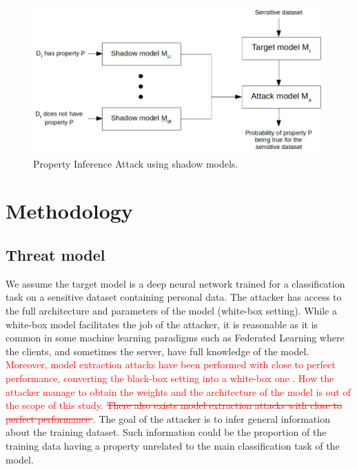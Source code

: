 \documentclass[11pt]{article}
\begin{document}
\begin{figure}[h]
    \centering
    \begin{minipage}{\textwidth}
        \centering
        \includegraphics[width=0.99\textwidth]{pia_diagram2.png} %
        \caption{Property Inference Attack using shadow models.}
        \label{pia_diagram}
    \end{minipage}\hfill
\end{figure}

\section{Methodology}

\subsection{Threat model}

We assume the target model is a deep neural network trained for a classification task on a sensitive dataset containing personal data. The attacker has access to the full architecture and parameters of the model (white-box setting). While a white-box model facilitates the job of the attacker, it is reasonable as it is common in some machine learning paradigms such as Federated Learning \cite{shokri2015privacy} where the clients, and sometimes the server, have full knowledge of the model. \textcolor{red}{Moreover, model extraction attacks have been performed with close to perfect performance, converting the black-box setting into a white-box one \cite{DBLP:journals/corr/PapernotMGJCS16}. How the attacker manage to obtain the weights and the architecture of the model is out of the scope of this study. \sout{There also exists model extraction attacks with close to perfect performance \cite{DBLP:journals/corr/PapernotMGJCS16}}}. The goal of the attacker is to infer general information about the training dataset. Such information could be the proportion of the training data having a property unrelated to the main classification task of the model.
\end{document}
